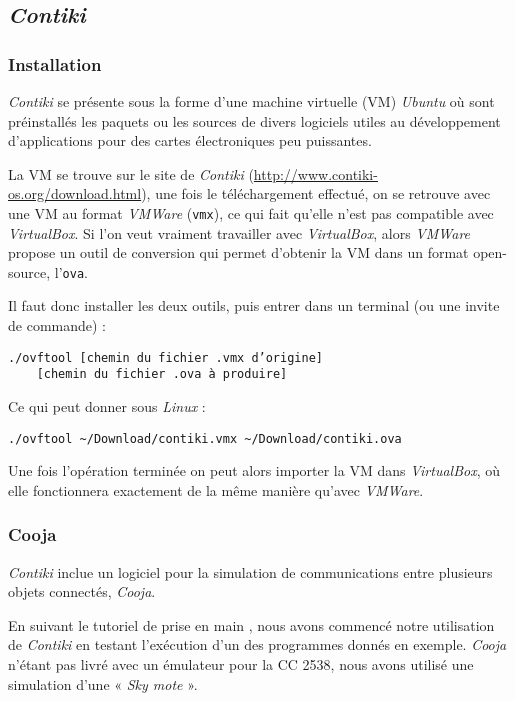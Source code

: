 \subsection{\emph{Contiki}}

\subsubsection{Installation}

\emph{Contiki} se présente sous la forme d’une machine virtuelle (VM) \emph{Ubuntu} où sont préinstallés les paquets ou les sources de divers logiciels utiles au développement d’applications pour des cartes électroniques peu puissantes.

La VM se trouve sur le site de \emph{Contiki} (\url{http://www.contiki-os.org/download.html}), une fois le téléchargement effectué, on se retrouve avec une VM au format \emph{VMWare} (\texttt{vmx}), ce qui fait qu’elle n'est pas compatible avec \emph{VirtualBox}.
Si l’on veut vraiment travailler avec \emph{VirtualBox}, alors \emph{VMWare} propose un outil de conversion qui permet d’obtenir la VM dans un format open-source, l’\texttt{ova}.

Il faut donc installer les deux outils, puis entrer dans un terminal (ou une invite de commande) :
\begin{verbatim}
./ovftool [chemin du fichier .vmx d’origine]
	[chemin du fichier .ova à produire]
\end{verbatim}
Ce qui peut donner sous \emph{Linux} :
\begin{verbatim}
./ovftool ~/Download/contiki.vmx ~/Download/contiki.ova
\end{verbatim}

Une fois l'opération terminée on peut alors importer la VM dans \emph{VirtualBox}, où elle fonctionnera exactement de la même manière qu’avec \emph{VMWare}.
 
\subsubsection{Cooja}

\emph{Contiki} inclue un logiciel pour la simulation de communications entre plusieurs objets connectés, \emph{Cooja}.

En suivant le tutoriel de prise en main , nous avons commencé notre utilisation de \emph{Contiki} en testant l’exécution d’un des programmes donnés en exemple.
\emph{Cooja} n’étant pas livré avec un émulateur pour la CC 2538, nous avons utilisé une simulation d’une « \textit{Sky mote} ».

